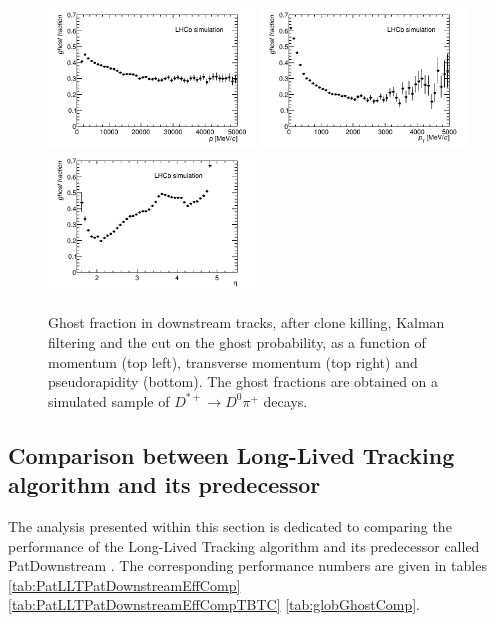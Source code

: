 \begin{figure}[tbph]
\begin{center}
\includegraphics[width =0.49\textwidth]{figures/EffPatLLT/overall/DstD0piGhostFracP_TBTC.png} 
\includegraphics[width =0.49\textwidth]{figures/EffPatLLT/overall/DstD0piGhostFracPt_TBTC.png}
\includegraphics[width =0.49\textwidth]{figures/EffPatLLT/overall/DstD0piGhostFracEta_TBTC.png} 
\caption{Ghost fraction in downstream tracks, after clone killing, Kalman filtering and the cut on the ghost probability, as a function of momentum (top left), transverse momentum (top right) and pseudorapidity (bottom). The ghost fractions are obtained on a simulated sample of $D^{*+} \rightarrow D^{0}\pi^+$ decays.}
\label{fig:ghostsPatLLTDstD0pi_TBTC}
 \end{center}
 \end{figure}


\subsection{Comparison between Long-Lived Tracking algorithm and its predecessor}
The analysis presented within this section is dedicated to comparing the performance of the Long-Lived Tracking algorithm and its predecessor called PatDownstream \cite{PatDownstream}. The corresponding performance numbers are given in tables \ref{tab:PatLLTPatDownstreamEffComp} \ref{tab:PatLLTPatDownstreamEffCompTBTC} \ref{tab:globGhostComp}. 

